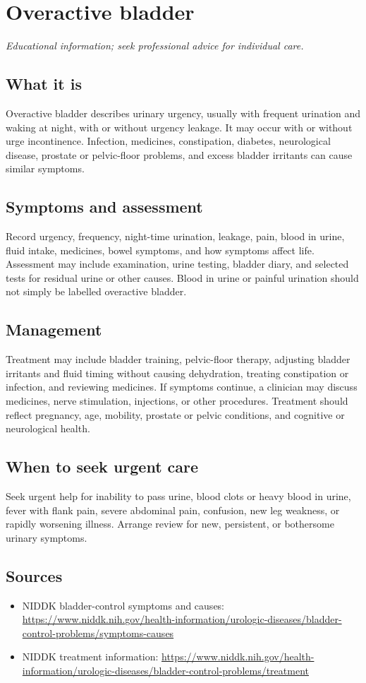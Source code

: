 \chapter{Overactive bladder}

\medskip
\noindent\textit{Educational information; seek professional advice for individual care.}

\section*{What it is}
Overactive bladder describes urinary urgency, usually with frequent urination and waking at night, with or without urgency leakage. It may occur with or without urge incontinence. Infection, medicines, constipation, diabetes, neurological disease, prostate or pelvic-floor problems, and excess bladder irritants can cause similar symptoms.

\section*{Symptoms and assessment}
Record urgency, frequency, night-time urination, leakage, pain, blood in urine, fluid intake, medicines, bowel symptoms, and how symptoms affect life. Assessment may include examination, urine testing, bladder diary, and selected tests for residual urine or other causes. Blood in urine or painful urination should not simply be labelled overactive bladder.

\section*{Management}
Treatment may include bladder training, pelvic-floor therapy, adjusting bladder irritants and fluid timing without causing dehydration, treating constipation or infection, and reviewing medicines. If symptoms continue, a clinician may discuss medicines, nerve stimulation, injections, or other procedures. Treatment should reflect pregnancy, age, mobility, prostate or pelvic conditions, and cognitive or neurological health.

\section*{When to seek urgent care}
Seek urgent help for inability to pass urine, blood clots or heavy blood in urine, fever with flank pain, severe abdominal pain, confusion, new leg weakness, or rapidly worsening illness. Arrange review for new, persistent, or bothersome urinary symptoms.

\section*{Sources}
\begin{itemize}
\item NIDDK bladder-control symptoms and causes: \url{https://www.niddk.nih.gov/health-information/urologic-diseases/bladder-control-problems/symptoms-causes}
\item NIDDK treatment information: \url{https://www.niddk.nih.gov/health-information/urologic-diseases/bladder-control-problems/treatment}
\end{itemize}
